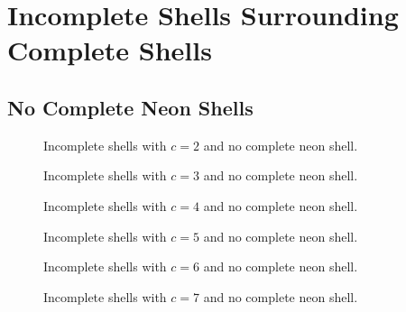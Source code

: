 \vfill
\clearpage
\pagebreak




\section{Incomplete Shells Surrounding Complete Shells}
\subsection{No Complete Neon Shells}
\begin{figure}[h]
\begin{minipage}{0.48\textwidth}
    \centering
    
    \caption{Incomplete shells with $c=2$ and no complete neon shell.}
    \label{incompl00-core02}
\end{minipage}
\hfill
\begin{minipage}{0.48\textwidth}
    \centering
    
    \caption{Incomplete shells with $c=3$ and no complete neon shell.}
    \label{incompl00-core03}
\end{minipage}
\end{figure}

\begin{figure}[!h]
\begin{minipage}{0.48\textwidth}
    \centering
    
    \caption{Incomplete shells with $c=4$ and no complete neon shell.}
    \label{incompl00-core04}
\end{minipage}
\hfill
\begin{minipage}{0.48\textwidth}
    \centering
    
    \caption{Incomplete shells with $c=5$ and no complete neon shell.}
    \label{incompl00-core05}
\end{minipage}
\end{figure}

\vspace{10cm}

\begin{figure}[!h]
\begin{minipage}{0.48\textwidth}
    \centering
    
    \caption{Incomplete shells with $c=6$ and no complete neon shell.}
    \label{incompl00-core06}
\end{minipage}
\hfill
\begin{minipage}{0.48\textwidth}
    \centering
    
    \caption{Incomplete shells with $c=7$ and no complete neon shell.}
    \label{incompl00-core07}
\end{minipage}
\end{figure}

